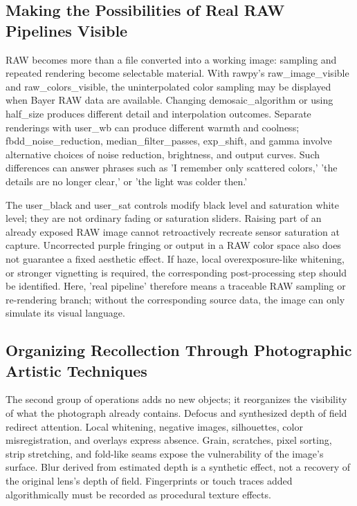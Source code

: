 \documentclass[manuscript,review,anonymous,authoryear]{acmart}
\begin{document}
\subsection{Making the Possibilities of Real RAW Pipelines Visible}

RAW becomes more than a file converted into a working image: sampling and repeated rendering become selectable material. With rawpy's raw\_image\_visible and raw\_colors\_visible, the uninterpolated color sampling may be displayed when Bayer RAW data are available. Changing demosaic\_algorithm or using half\_size produces different detail and interpolation outcomes. Separate renderings with user\_wb can produce different warmth and coolness; fbdd\_noise\_reduction, median\_filter\_passes, exp\_shift, and gamma involve alternative choices of noise reduction, brightness, and output curves. Such differences can answer phrases such as 'I remember only scattered colors,' 'the details are no longer clear,' or 'the light was colder then.'


The user\_black and user\_sat controls modify black level and saturation white level; they are not ordinary fading or saturation sliders. Raising part of an already exposed RAW image cannot retroactively recreate sensor saturation at capture. Uncorrected purple fringing or output in a RAW color space also does not guarantee a fixed aesthetic effect. If haze, local overexposure-like whitening, or stronger vignetting is required, the corresponding post-processing step should be identified. Here, 'real pipeline' therefore means a traceable RAW sampling or re-rendering branch; without the corresponding source data, the image can only simulate its visual language.


\subsection{Organizing Recollection Through Photographic Artistic Techniques}

The second group of operations adds no new objects; it reorganizes the visibility of what the photograph already contains. Defocus and synthesized depth of field redirect attention. Local whitening, negative images, silhouettes, color misregistration, and overlays express absence. Grain, scratches, pixel sorting, strip stretching, and fold-like seams expose the vulnerability of the image's surface. Blur derived from estimated depth is a synthetic effect, not a recovery of the original lens's depth of field. Fingerprints or touch traces added algorithmically must be recorded as procedural texture effects.
\end{document}
